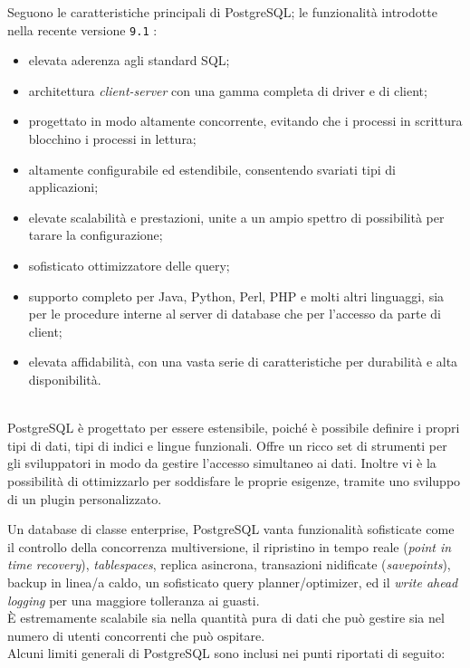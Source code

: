 Seguono le caratteristiche principali di PostgreSQL; le funzionalit\`{a} introdotte nella recente versione \verb"9.1" :
\begin{itemize}
\item 
elevata aderenza agli standard SQL;
\item 
architettura\textit{ client-server} con una gamma completa di driver e di client;
\item 
progettato in modo altamente concorrente, evitando che i processi in scrittura blocchino i processi in lettura;
\item 
altamente configurabile ed estendibile, consentendo svariati tipi di applicazioni;
\item 
elevate scalabilit\`{a} e prestazioni, unite a un ampio spettro di possibilit\`{a} per tarare la configurazione;
\item 
sofisticato ottimizzatore delle query;
\item 
supporto completo per Java, Python, Perl, PHP e molti altri linguaggi, sia per le procedure interne al server di database che per l'accesso da parte di client;
\item 
elevata affidabilit\`{a}, con una vasta serie di caratteristiche per durabilit\`{a} e alta disponibilit\`{a}.\cite{etichetta12}
\end{itemize}\\

PostgreSQL \`{e} progettato per essere estensibile, poich\'{e} \`{e} possibile definire i propri tipi di dati, tipi di indici e lingue funzionali. Offre un ricco set di strumenti per gli sviluppatori in modo da gestire l'accesso simultaneo ai dati. Inoltre vi \`{e} la possibilit\`{a} di ottimizzarlo per soddisfare le proprie esigenze, tramite uno sviluppo di un plugin personalizzato.

Un database di classe enterprise, PostgreSQL vanta funzionalit\`{a} sofisticate come il controllo della concorrenza multiversione, il ripristino in tempo reale (\textit{point in time recovery}), \textit{tablespaces}, replica asincrona, transazioni nidificate (\textit{savepoints}), backup in linea/a caldo, un sofisticato query planner/optimizer, ed il \textit{write ahead logging} per una maggiore tolleranza ai guasti.\\
\`{E} estremamente scalabile sia nella quantit\`{a} pura di dati che pu\`{o} gestire sia nel numero di utenti concorrenti che pu\`{o} ospitare.\cite{etichetta15}\\

Alcuni limiti generali di PostgreSQL sono inclusi nei punti riportati di seguito:\\

